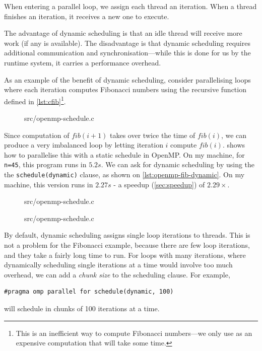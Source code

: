 \begin{definition}
  When entering a parallel loop, we assign each thread an iteration.
  When a thread finishes an iteration, it receives a new one to
  execute.
\end{definition}

The advantage of dynamic scheduling is that an idle thread will
receive more work (if any is available).  The disadvantage is that
dynamic scheduling requires additional communication and
synchronisation---while this is done for us by the runtime system, it
carries a performance overhead.

As an example of the benefit of dynamic scheduling, consider
parallelising loops where each iteration computes Fibonacci numbers
using the recursive function defined in \cref{lst:cfib}\footnote{This
  is an inefficient way to compute Fibonacci numbers---we only use as
  an expensive computation that will take some time.}.

\begin{figure}

{src/openmp-schedule.c}
\end{figure}

Since computation of $fib(i+1)$ takes over twice the time of $fib(i)$,
we can produce a very imbalanced loop by letting iteration $i$ compute
$fib(i)$.   shows how to parallelise this
with a static schedule in OpenMP.  On my machine, for \texttt{n=45},
this program runs in $5.2s$.  We can ask for dynamic scheduling by
using the the \texttt{schedule(dynamic)} clause, as shown on
\cref{lst:openmp-fib-dynamic}.  On my machine, this version runs in
$2.27s$ - a speedup (\cref{sec:speedup}) of $2.29\times$.

\begin{figure}

{src/openmp-schedule.c}
\end{figure}

\begin{figure}

{src/openmp-schedule.c}
\end{figure}

By default, dynamic scheduling assigns single loop iterations to
threads.  This is not a problem for the Fibonacci example, because
there are few loop iterations, and they take a fairly long time to
run.  For loops with many iterations, where dynamically scheduling
single iterations at a time would involve too much overhead, we can
add a \emph{chunk size} to the scheduling clause.  For example,
\begin{lstlisting}
#pragma omp parallel for schedule(dynamic, 100)
\end{lstlisting}
will schedule in chunks of 100 iterations at a time.

